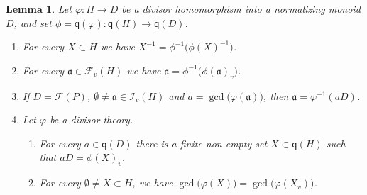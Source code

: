 \documentclass[a4paper]{amsart}
\newtheorem{lemma}[theorem]{Lemma}
\theoremstyle{definition}
\numberwithin{equation}{section}
\begin{document}
\medskip
\begin{lemma} \label{4.11}
Let $\varphi \colon H \to D$ be a divisor homomorphism into a
normalizing monoid $D$, and set $\phi = \mathsf q (\varphi) \colon
\mathsf q (H) \to \mathsf q (D)$.
\begin{enumerate}
\item For every $X \subset H$ we have $X^{-1} = \phi^{-1} \big( \phi
(X)^{-1} \big)$.

\smallskip
\item For every $\mathfrak a \in \mathcal F_v (H)$ we have
$\mathfrak a = \phi^{-1} \big( \phi (\mathfrak a)_v \big)$.

\smallskip
\item If $D = \mathcal F (P)$, $\emptyset \ne \mathfrak a \in
\mathcal I_v (H)$ and $a = \gcd \big( \varphi (\mathfrak a) \big)$,
then $\mathfrak a = \varphi^{-1} ( aD)$.

\smallskip
\item Let $\varphi$ be a divisor theory.
      \begin{enumerate}
      \smallskip
      \item For every $a \in \mathsf q (D)$ there is a finite non-empty set $X \subset \mathsf q (H)$ such that $aD = \phi (X)_v$.

      \smallskip
      \item For every $\emptyset \ne X \subset
      H$, we have  $\gcd \big( \varphi (X) \big) = \gcd \big( \varphi (X_v) \big)$.
      \end{enumerate}
\end{enumerate}
\end{lemma}
\end{document}
